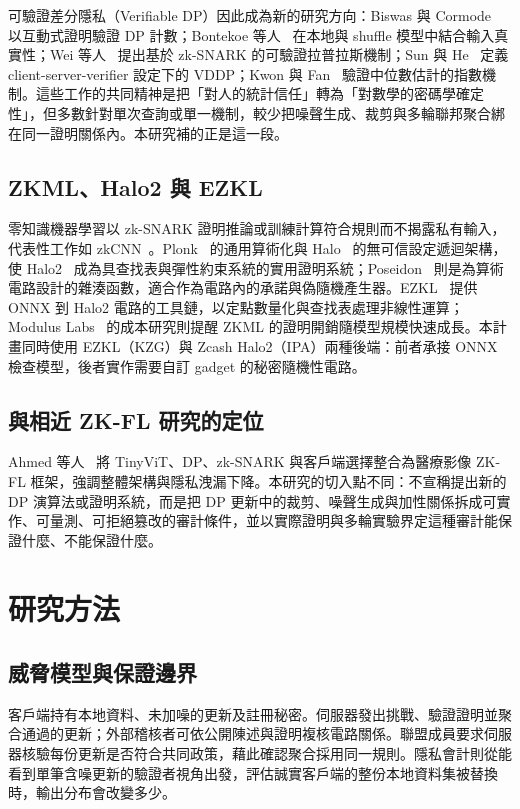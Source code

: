 \documentclass[12pt,a4paper]{article}
\begin{document}
可驗證差分隱私（Verifiable DP）因此成為新的研究方向：Biswas 與 Cormode~\cite{biswas2022verifiable} 以互動式證明驗證 DP 計數；Bontekoe 等人~\cite{bontekoe2025verifiable} 在本地與 shuffle 模型中結合輸入真實性；Wei 等人~\cite{wei2025verifiable} 提出基於 zk-SNARK 的可驗證拉普拉斯機制；Sun 與 He~\cite{sun2025vddp} 定義 client-server-verifier 設定下的 VDDP；Kwon 與 Fan~\cite{kwon2025verifying} 驗證中位數估計的指數機制。這些工作的共同精神是把「對人的統計信任」轉為「對數學的密碼學確定性」，但多數針對單次查詢或單一機制，較少把噪聲生成、裁剪與多輪聯邦聚合綁在同一證明關係內。本研究補的正是這一段。

\subsection{ZKML、Halo2 與 EZKL}
零知識機器學習以 zk-SNARK 證明推論或訓練計算符合規則而不揭露私有輸入，代表性工作如 zkCNN~\cite{liu2021zkcnn}。Plonk~\cite{gabizon2019plonk} 的通用算術化與 Halo~\cite{bowe2019halo} 的無可信設定遞迴架構，使 Halo2~\cite{halo2repo} 成為具查找表與彈性約束系統的實用證明系統；Poseidon~\cite{grassi2021poseidon} 則是為算術電路設計的雜湊函數，適合作為電路內的承諾與偽隨機產生器。EZKL~\cite{ezklrepo} 提供 ONNX 到 Halo2 電路的工具鏈，以定點數量化與查找表處理非線性運算；Modulus Labs~\cite{modulus2023cost} 的成本研究則提醒 ZKML 的證明開銷隨模型規模快速成長。本計畫同時使用 EZKL（KZG）與 Zcash Halo2（IPA）兩種後端：前者承接 ONNX 檢查模型，後者實作需要自訂 gadget 的秘密隨機性電路。

\subsection{與相近 ZK-FL 研究的定位}
Ahmed 等人~\cite{ahmed2025zkai} 將 TinyViT、DP、zk-SNARK 與客戶端選擇整合為醫療影像 ZK-FL 框架，強調整體架構與隱私洩漏下降。本研究的切入點不同：不宣稱提出新的 DP 演算法或證明系統，而是把 DP 更新中的裁剪、噪聲生成與加性關係拆成可實作、可量測、可拒絕篡改的審計條件，並以實際證明與多輪實驗界定這種審計能保證什麼、不能保證什麼。

\section{研究方法}
\subsection{威脅模型與保證邊界}
\label{sec:threat}
客戶端持有本地資料、未加噪的更新及註冊秘密。伺服器發出挑戰、驗證證明並聚合通過的更新；外部稽核者可依公開陳述與證明複核電路關係。聯盟成員要求伺服器核驗每份更新是否符合共同政策，藉此確認聚合採用同一規則。隱私會計則從能看到單筆含噪更新的驗證者視角出發，評估誠實客戶端的整份本地資料集被替換時，輸出分布會改變多少。
\end{document}
